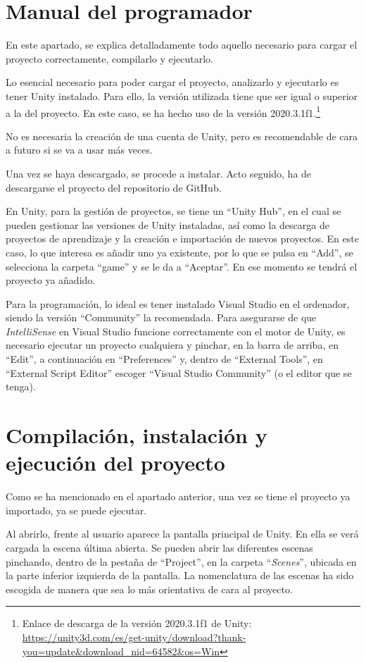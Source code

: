 \section{Manual del programador}

En este apartado, se explica detalladamente todo aquello necesario para cargar el proyecto correctamente, compilarlo y ejecutarlo.

Lo esencial necesario para poder cargar el proyecto, analizarlo y ejecutarlo es tener Unity instalado. Para ello, la versión utilizada tiene que ser igual o superior a la del proyecto. En este caso, se ha hecho uso de la versión 2020.3.1f1.\footnote{Enlace de descarga de la versión 2020.3.1f1 de Unity: \url{https://unity3d.com/es/get-unity/download?thank-you=update&download_nid=64582&os=Win}}

No es necesaria la creación de una cuenta de Unity, pero es recomendable de cara a futuro si se va a usar más veces.

Una vez se haya descargado, se procede a instalar. Acto seguido, ha de descargarse el proyecto del repositorio de GitHub.

En Unity, para la gestión de proyectos, se tiene un ``Unity Hub'', en el cual se pueden gestionar las versiones de Unity instaladas, así como la descarga de proyectos de aprendizaje y la creación e importación de nuevos proyectos. En este caso, lo que interesa es añadir uno ya existente, por lo que se pulsa en ``Add'', se selecciona la carpeta ``game'' y se le da a ``Aceptar''. En ese momento se tendrá el proyecto ya añadido.

Para la programación, lo ideal es tener instalado Visual Studio en el ordenador, siendo la versión ``Community'' la recomendada. Para asegurarse de que \textit{IntelliSense} en Visual Studio funcione correctamente con el motor de Unity, es necesario ejecutar un proyecto cualquiera y pinchar, en la barra de arriba, en ``Edit'', a continuación en ``Preferences'' y, dentro de ``External Tools'', en ``External Script Editor'' escoger ``Visual Studio Community'' (o el editor que se tenga).

\section{Compilación, instalación y ejecución del proyecto}

Como se ha mencionado en el apartado anterior, una vez se tiene el proyecto ya importado, ya se puede ejecutar.

Al abrirlo, frente al usuario aparece la pantalla principal de Unity. En ella se verá cargada la escena última abierta. Se pueden abrir las diferentes escenas pinchando, dentro de la pestaña de ``Project'', en la carpeta ``\textit{Scenes}'', ubicada en la parte inferior izquierda de la pantalla. La nomenclatura de las escenas ha sido escogida de manera que sea lo más orientativa de cara al proyecto. 

